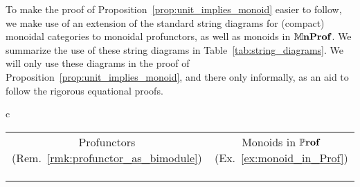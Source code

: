 \documentclass[11pt,oneside,article]{memoir}
\begin{document}
To make the proof of Proposition~\ref{prop:unit_implies_monoid} easier to follow, we make use of an
extension of the standard string diagrams for (compact) monoidal categories to monoidal profunctors,
as well as monoids in $\mathbb{M}\mathbf{nProf}$. We summarize the use of these string diagrams in
Table~\ref{tab:string_diagrams}. We will only use these diagrams in the proof of
Proposition~\ref{prop:unit_implies_monoid}, and there only informally, as an aid to follow the
rigorous equational proofs. 

\begin{table}
  \centering
  \setlength{\extrarowheight}{3pt}
  \begin{tabular}{c}
    \toprule
    \begin{tabular}{@{\hspace{6pt}}cccc@{\hspace{6pt}}}
      \multicolumn{2}{c}{Profunctors (Rem.~\ref{rmk:profunctor_as_bimodule})}
      & \multicolumn{2}{c}{Monoids in $\mathbb{P}\mathbf{rof}$ (Ex.~\ref{ex:monoid_in_Prof})} \\
      \cmidrule[\lightrulewidth](r){1-2}\cmidrule[\lightrulewidth](l){3-4}
      \begin{tikzpicture}
      	\matrix {
      		\node [draw, circle] (f) {f}; \&[.2cm]
      		\node [draw]         (m) {m}; \\
      	};
      	\begin{scope}[on background layer]
      		\node[fit={(m)}] (back) {};
      	\end{scope}
      	\draw[ar] ($(f)-(1cm,0)$) to["c'"] (f);
      	\draw[ar] (f) to["c"] (m.west);
      	\draw[ar] (m) to["d"] +(1cm,0);
      	\node [caption] {$m\cdot f$};
      \end{tikzpicture}
      &
      \begin{tikzpicture}
      	\matrix {
      		\node [draw]        (m) {m}; \&[.2cm]
      		\node [draw,circle] (g) {g}; \\
      	};
      	\begin{scope}[on background layer]
      		\node[fit={(m)}] (back) {};
      	\end{scope}
      	\draw[ar] ($(m)-(1cm,0)$) to["c"] (m);

\end{tikzpicture}
\end{tabular}
\end{tabular}
\end{table}
\end{document}

